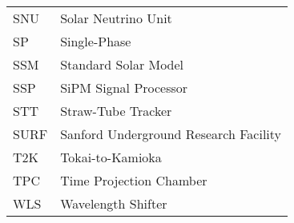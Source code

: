 \begin{longtable}{l p{11cm}}
SNU         & Solar Neutrino Unit \\
SP          & Single-Phase \\
SSM         & Standard Solar Model \\
SSP         & SiPM Signal Processor \\
STT         & Straw-Tube Tracker \\
SURF        & Sanford Underground Research Facility \\
T2K         & Tokai-to-Kamioka \\
TPC         & Time Projection Chamber \\
WLS         & Wavelength Shifter \\
\end{longtable}


